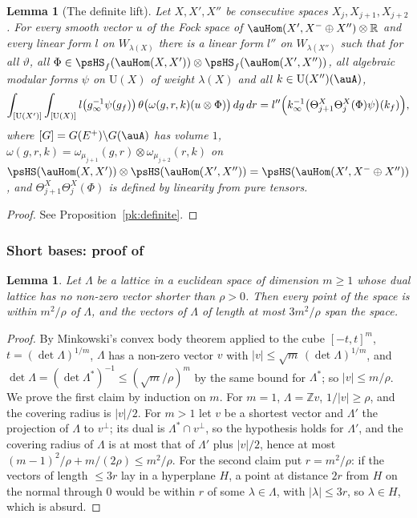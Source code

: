 \documentclass[10pt]{amsart}
\newtheorem{lemma}[theorem]{Lemma}
\theoremstyle{definition}
\theoremstyle{remark}
\newcommand{\R}{\mathbb R}
\newcommand{\Z}{\mathbb Z}
\providecommand{\auU}{\mathrm U}
\begin{document}
\begin{lemma}[The definite lift]\label{ps:definite}
Let $X,X',X''$ be consecutive spaces $X_{j},X_{j+1},X_{j+2}$. For every smooth vector $u$ of the Fock
space of $\auHom(X',X^-\oplus X'')\otimes\R$ and every linear form $l$ on $W_{\lambda(X)}$ there is
a linear form $l''$ on $W_{\lambda(X'')}$ such that for all $\vartheta$, all
$\Phi\in\psHS_f(\auHom(X,X'))\otimes\psHS_f(\auHom(X',X''))$, all algebraic modular forms $\psi$ on
$\auU(X)$ of weight $\lambda(X)$ and all $k\in\auU(X'')(\auA)$,
\[
\int_{[\auU(X')]}\int_{[\auU(X)]}l\bigl(g_\infty^{-1}\psi(g_f)\bigr)\,\theta\bigl(\omega(g,r,k)(u\otimes
\Phi)\bigr)\,dg\,dr=l''\Bigl(k_\infty^{-1}\bigl(\Theta^X_{j+1}\Theta^X_j(\Phi)\psi\bigr)(k_f)\Bigr),
\]
where $[G]=G(E^+)\backslash G(\auA)$ has volume $1$, $\omega(g,r,k)=\omega_{\mu_{j+1}}(g,r)\otimes
\omega_{\mu_{j+2}}(r,k)$ on $\psHS(\auHom(X,X'))\otimes\psHS(\auHom(X',X''))=\psHS(\auHom(X',
X^-\oplus X''))$, and $\Theta^X_{j+1}\Theta^X_j(\Phi)$ is defined by linearity from pure tensors.
\end{lemma}
\begin{proof} See Proposition~\ref{pk:definite}. \end{proof}

\subsubsection{Short bases: proof of \texorpdfstring{{\cite[Lemma~14.21]{P46}}}{[Row D, Lemma~14.21]}}\label{ps:ss-short}

\begin{lemma}\label{ps:transfer}
Let $\Lambda$ be a lattice in a euclidean space of dimension $m\ge1$ whose dual lattice has no
non-zero vector shorter than $\rho>0$. Then every point of the space is within $m^2/\rho$ of
$\Lambda$, and the vectors of $\Lambda$ of length at most $3m^2/\rho$ span the space.
\end{lemma}
\begin{proof}
By Minkowski's convex body theorem applied to the cube $[-t,t]^m$, $t=(\det\Lambda)^{1/m}$, $\Lambda$ has a non-zero vector $v$ with $|v|\le\sqrt m\,
(\det\Lambda)^{1/m}$, and $\det\Lambda=(\det\Lambda^*)^{-1}\le(\sqrt m/\rho)^m$ by the same bound
for $\Lambda^*$; so $|v|\le m/\rho$. We prove the first claim by induction on $m$. For $m=1$,
$\Lambda=\Z v$, $1/|v|\ge\rho$, and the covering radius is $|v|/2$. For $m>1$ let $v$ be a
shortest vector and $\Lambda'$ the projection of $\Lambda$ to $v^\perp$; its dual is
$\Lambda^*\cap v^\perp$, so the hypothesis holds for $\Lambda'$, and the covering radius of
$\Lambda$ is at most that of $\Lambda'$ plus $|v|/2$, hence at most $(m-1)^2/\rho+m/(2\rho)\le
m^2/\rho$. For the second claim put $r=m^2/\rho$: if the vectors of length $\le3r$ lay in a
hyperplane $H$, a point at distance $2r$ from $H$ on the normal through $0$ would be within $r$ of
some $\lambda\in\Lambda$, with $|\lambda|\le3r$, so $\lambda\in H$, which is absurd.
\end{proof}
\end{document}
